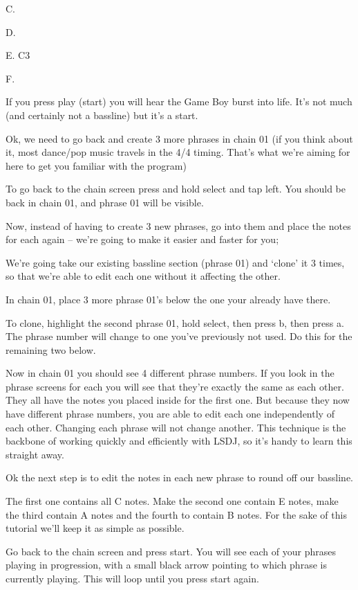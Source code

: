 \documentclass[]{article}
\begin{document}
C.

D.

E. C3

F.

If you press play (start) you will hear the Game Boy burst into life. It’s not much (and certainly not a bassline) but it’s a start.

Ok, we need to go back and create 3 more phrases in chain 01 (if you think about it, most dance/pop music travels in the 4/4 timing. That’s what we’re aiming for here to get you familiar with the program)

To go back to the chain screen press and hold select and tap left. You should be back in chain 01, and phrase 01 will be visible.

Now, instead of having to create 3 new phrases, go into them and place the notes for each again – we’re going to make it easier and faster for you;

We’re going take our existing bassline section (phrase 01) and ‘clone’ it 3 times, so that we’re able to edit each one without it affecting the other.

In chain 01, place 3 more phrase 01’s below the one your already have there.

To clone, highlight the second phrase 01, hold select, then press b, then press a. The phrase number will change to one you’ve previously not used. Do this for the remaining two below.

Now in chain 01 you should see 4 different phrase numbers. If you look in the phrase screens for each you will see that they’re exactly the same as each other. They all have the notes you placed inside for the first one. But because they now have different phrase numbers, you are able to edit each one independently of each other. Changing each phrase will not change another. This technique is the backbone of working quickly and efficiently with LSDJ, so it’s handy to learn this straight away.

Ok the next step is to edit the notes in each new phrase to round off our bassline.

The first one contains all C notes. Make the second one contain E notes, make the third contain A notes and the fourth to contain B notes. For the sake of this tutorial we’ll keep it as simple as possible.

Go back to the chain screen and press start. You will see each of your phrases playing in progression, with a small black arrow pointing to which phrase is currently playing. This will loop until you press start again.
\end{document}

